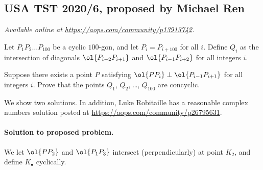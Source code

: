 \documentclass[11pt]{scrartcl}
\begin{document}
\subsection{USA TST 2020/6, proposed by Michael Ren}
\textsl{Available online at \url{https://aops.com/community/p13913742}.}
\begin{mdframed}[style=mdpurplebox,frametitle={Problem statement}]
Let $P_1P_2 \dots P_{100}$ be a cyclic $100$-gon,
and let $P_i = P_{i+100}$ for all $i$.
Define $Q_i$ as the intersection of diagonals
$\ol{P_{i-2}P_{i+1}}$ and $\ol{P_{i-1}P_{i+2}}$ for all integers $i$.

Suppose there exists a point $P$
satisfying $\ol{PP_i} \perp \ol{P_{i-1}P_{i+1}}$
for all integers $i$.
Prove that the points $Q_1$, $Q_2$, \dots, $Q_{100}$
are concyclic.
\end{mdframed}
We show two solutions.
In addition, Luke Robitaille has a reasonable complex numbers solution
posted at \url{https://aops.com/community/p26795631}.

\paragraph{Solution to proposed problem.}
We let $\ol{PP_2}$ and $\ol{P_1P_3}$
intersect (perpendicularly) at point $K_2$,
and define $K_\bullet$ cyclically.
\end{document}
